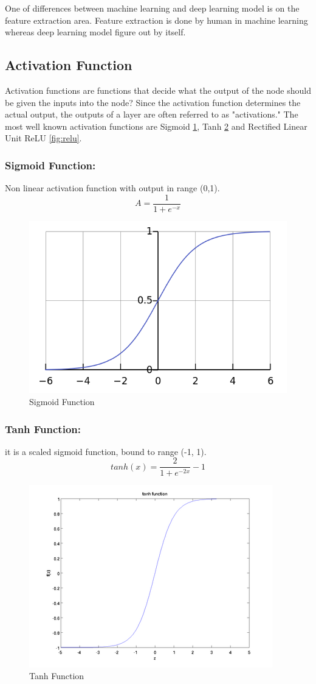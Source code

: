 \documentclass[12pt]{report}
\begin{document}
One of differences between machine learning and deep learning model is on the feature extraction area. 
Feature extraction is done by human in machine learning whereas deep learning model figure out by itself.

\subsection{Activation Function}
Activation functions are functions that decide what the output of the node should be given the inputs into the node? 
Since the activation function determines the actual output, the outputs of a layer are often referred to as "activations."
The most well known activation functions are Sigmoid \ref{fig:sigmoid}, Tanh \ref{fig:tanh} and
Rectified Linear Unit ReLU \ref{fig:relu}.

\subsubsection{Sigmoid Function:}
Non linear activation function with output in range (0,1).
$$ A = \frac{1}{1+e^{-x}} $$

\begin{figure} [h]
    \centering
    \includegraphics[width=.6\textwidth]{./images/sigmoid.png}
    \caption{Sigmoid Function}
    \label{fig:sigmoid}
\end{figure}

\subsubsection{Tanh Function:}
it is a scaled sigmoid function, bound to range (-1, 1).
$$ tanh(x) = \frac{2}{1+ e^{-2x}} - 1 $$

\begin{figure} [h]
    \centering
    \includegraphics[width=.5\textwidth]{./images/tanh.png}
    \caption{Tanh Function}
    \label{fig:tanh}
\end{figure}
\end{document}
